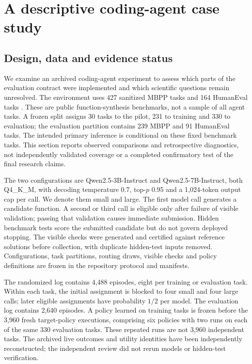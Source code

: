 \section{A descriptive coding-agent case study}
\label{sec:coding-case-study}

\subsection{Design, data and evidence status}
We examine an archived coding-agent experiment to assess which parts of the evaluation contract were implemented
and which scientific questions remain unresolved. The environment uses 427 sanitized MBPP tasks and 164 HumanEval
tasks \citep{austin2021program,chen2021code}. These are public function-synthesis benchmarks, not a sample of all
agent tasks. A frozen split assigns 30 tasks to the pilot, 231 to training and 330 to evaluation; the evaluation
partition contains 239 MBPP and 91 HumanEval tasks. The intended primary inference is conditional on these fixed
benchmark tasks. This section reports observed comparisons and retrospective diagnostics, not independently
validated coverage or a completed confirmatory test of the final research claims.

The two configurations are Qwen2.5-3B-Instruct and Qwen2.5-7B-Instruct, both Q4\_K\_M, with decoding temperature
0.7, top-$p$ 0.95 and a 1,024-token output cap per call. We denote them small and large. The first model call
generates a candidate function. A second or third call is eligible only after failure of visible validation;
passing that validation causes immediate submission. Hidden benchmark tests score the submitted candidate but
do not govern deployed stopping. The visible checks were generated and certified against reference solutions
before collection, with duplicate hidden-test inputs removed. Configurations, task partitions, routing draws,
visible checks and policy definitions are frozen in the repository protocol and manifests.

The randomized log contains 4,488 episodes, eight per training or evaluation task. Within each task, the initial
assignment is blocked to four small and four large calls; later eligible assignments have probability $1/2$ per
model. The evaluation log contains 2,640 episodes. A policy learned on training tasks is frozen before the
3,960 fresh target-policy executions, comprising six policies with two runs on each of the same 330 evaluation
tasks. These repeated runs are not 3,960 independent tasks. The archived live outcomes and utility identities
have been independently reconstructed; the independent review did not rerun models or hidden-test verification.

